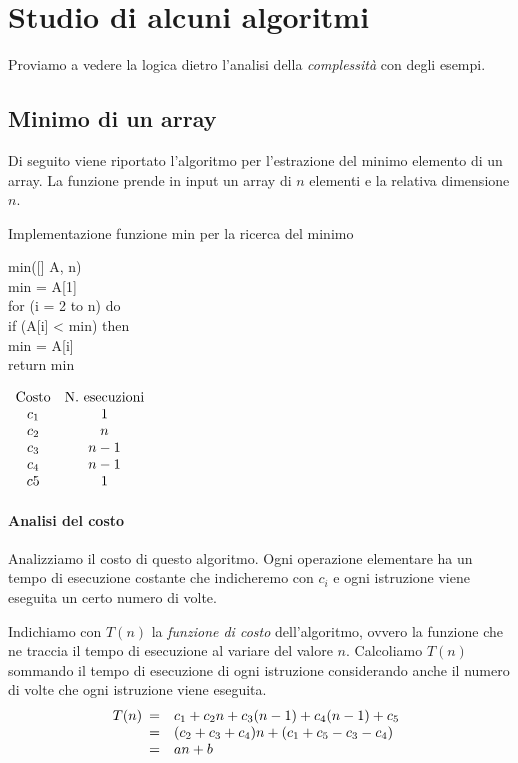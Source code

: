 \section{Studio di alcuni algoritmi}
Proviamo a vedere la logica dietro l'analisi della \emph{complessità} con degli
esempi.
\subsection{Minimo di un array}
Di seguito viene riportato l'algoritmo per l'estrazione del minimo elemento di
un array. La funzione prende in input un array di $n$ elementi e la relativa
dimensione $n$.

\begin{code}{Implementazione funzione min per la ricerca del minimo}
\begin{minipage}[t]{0.66\textwidth}
\ind{} min([] A,  n)\\
     min = A[1]\\
    \indf for (i = 2 to n) do\\
        \indff if (A[i] < min) then\\
            min = A[i]\\
    \indf return min
\end{minipage}
\hfill
\begin{minipage}[t]{0.32\textwidth}
    $\begin{array}[t]{cc}
        \text{Costo} & \text{N. esecuzioni}\\
        c_1 & 1\\
        c_2 & n\\
        c_3 & n-1\\
        c_4 & n-1\\
        c5 & 1
    \end{array}$
\end{minipage}
\end{code}

\paragraph{Analisi del costo}
Analizziamo il costo di questo algoritmo. Ogni operazione elementare ha un tempo
di esecuzione costante che indicheremo con $c_i$ e ogni istruzione viene eseguita
un certo numero di volte.

\newpage\noindent
Indichiamo con $T(n)$ la \emph{funzione di costo} dell'algoritmo,
ovvero la funzione che ne traccia il tempo di esecuzione al variare del valore $n$.
Calcoliamo $T(n)$ sommando il tempo di esecuzione di ogni istruzione considerando
anche il numero di volte che ogni istruzione viene eseguita.
\[T(n)\begin{array}[t]{cl}
    = & c_1+c_2n+c_3(n-1)+c_4(n-1)+c_5\\
    = & (c_2+c_3+c_4)n+(c_1+c_5-c_3-c_4)\\
    = & an+b
\end{array}\]

